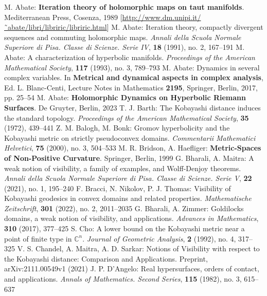 \begin{thebibliography}{widest entry}
   M. Abate: \textbf{Iteration theory of holomorphic maps on taut manifolds}. Mediterranean Press, Cosenza, 1989 [\url{http://www.dm.unipi.it/˜abate/libri/libriric/libriric.html}]
   M. Abate: Iteration theory, compactly divergent sequences and commuting holomorphic maps. \textit{Annali della Scuola Normale Superiore di Pisa. Classe di Scienze. Serie IV}, \textbf{18} (1991), no. 2, 167--191
   M. Abate: A characterization of hyperbolic manifolds. \textit{Proceedings of the American Mathematical Society}, \textbf{117} (1993), no. 3, 789--793
   M. Abate: Dynamics in several complex variables. In \textbf{Metrical and dynamical aspects in complex analysis}, Ed. L. Blanc-Centi, Lecture Notes in Mathematics \textbf{2195}, Springer, Berlin, 2017, pp. 25--54
   M. Abate: \textbf{Holomorphic Dynamics on Hyperbolic Riemann Surfaces}. De Gruyter, Berlin, 2023
   T. J. Barth: The Kobayashi distance induces the standard topology. \textit{Proceedings of the American Mathematical Society}, \textbf{35} (1972), 439--441
   Z. M. Balogh, M. Bonk: Gromov hyperbolicity and the Kobayashi metric on strictly pseudoconvex domains. \textit{Commentarii Mathematici Helvetici}, \textbf{75} (2000), no. 3, 504--533
   M. R. Bridson, A. Haefliger: \textbf{Metric-Spaces of Non-Positive Curvature}. Springer, Berlin, 1999
   G. Bharali, A. Maitra: A weak notion of visibility, a family of examples, and Wolff-Denjoy theorems. \textit{Annali della Scuola Normale Superiore di Pisa. Classe di Scienze. Serie V}, \textbf{22} (2021), no. 1, 195--240
   F. Bracci, N. Nikolov, P. J. Thomas: Visibility of Kobayashi geodesics in convex domains and related properties. \textit{Mathematische Zeitschrift}, \textbf{301} (2022), no. 2, 2011--2035
   G. Bharali, A. Zimmer: Goldilocks domains, a weak notion of visibility, and applications. \textit{Advances in Mathematics}, \textbf{310} (2017), 377--425
   S. Cho: A lower bound on the Kobayashi metric near a point of finite type in $\mathbb{C}^n$. \textit{Journal of Geometric Analysis}, \textbf{2} (1992), no. 4, 317--325
   V. S. Chandel, A. Maitra, A. D. Sarkar: Notions of Visibility with respect to the Kobayashi distance: Comparison and Applications. Preprint, arXiv:2111.00549v1 (2021)
   J. P. D'Angelo: Real hypersurfaces, orders of contact, and applications. \textit{Annals of Mathematics. Second Series}, \textbf{115} (1982), no. 3, 615--637

\end{thebibliography}
